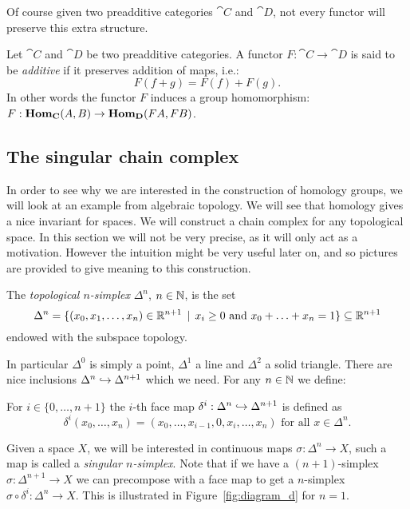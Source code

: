Of course given two preadditive categories $\cat{C}$ and $\cat{D}$, not every functor will preserve this extra structure.
\begin{definition}
	Let $\cat{C}$ and $\cat{D}$ be two preadditive categories. A functor $F: \cat{C} \to \cat{D}$ is said to be \emph{additive} if it preserves addition of maps, i.e.:
	$$ F(f + g) = F(f) + F(g). $$
	In other words the functor $F$ induces a group homomorphism: $F : \mathbf{Hom}_{\mathbf{C}}(A, B) \to \mathbf{Hom}_{\mathbf{D}}(FA, FB)$.
\end{definition}


\subsection{The singular chain complex}
\label{sec:singular}
In order to see why we are interested in the construction of homology groups, we will look at an example from algebraic topology. We will see that homology gives a nice invariant for spaces. We will construct a chain complex for any topological space. In this section we will not be very precise, as it will only act as a motivation. However the intuition might be very useful later on, and so pictures are provided to give meaning to this construction.

\begin{definition}
	The \emph{topological $n$-simplex} $\Delta^n$, $n \in \mathbb{N}$, is the set
	$$ \Delta^n = \{(x_0, x_1, \ldots, x_n) \in \mathbb{R}^{n+1} \,\mid\, x_i \geq 0 \text{ and } x_0 + \ldots + x_n = 1 \} \subseteq \mathbb{R}^{n+1} $$
	endowed with the subspace topology.
\end{definition}

In particular $\Delta^0$ is simply a point, $\Delta^1$ a line and $\Delta^2$ a solid triangle. There are nice inclusions $\Delta^n \hookrightarrow \Delta^{n+1}$ which we need. For any $n \in \mathbb{N}$ we define:
\begin{definition}
	For $i \in \{0, \ldots, n+1\}$ the $i$-th face map $\delta^i : \Delta^n \hookrightarrow \Delta^{n+1}$ is defined as
	$$ \delta^i (x_0, \ldots, x_n) = (x_0, \ldots, x_{i-1}, 0, x_{i}, \ldots, x_n) \text{ for all } x \in \Delta^n.$$
\end{definition}

Given a space $X$, we will be interested in continuous maps $\sigma : \Delta^n \to X$, such a map is called a \emph{singular $n$-simplex}. Note that if we have a $(n+1)$-simplex $\sigma : \Delta^{n+1} \to X$ we can precompose with a face map to get a $n$-simplex $\sigma \circ \delta^i : \Delta^n \to X$. This is illustrated in Figure~\ref{fig:diagram_d} for $n=1$.

